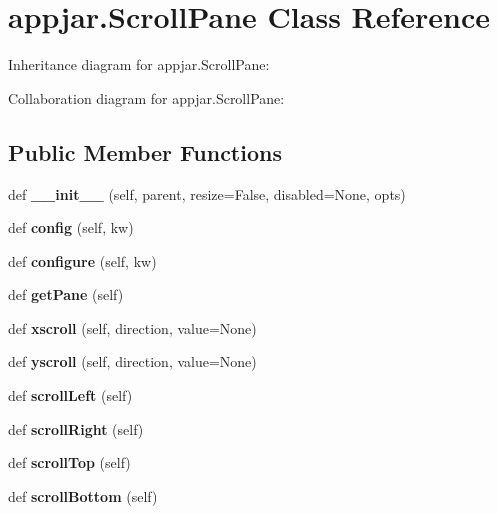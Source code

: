 \hypertarget{classappjar_1_1_scroll_pane}{}\section{appjar.\+Scroll\+Pane Class Reference}
\label{classappjar_1_1_scroll_pane}


Inheritance diagram for appjar.\+Scroll\+Pane\+:


Collaboration diagram for appjar.\+Scroll\+Pane\+:
\subsection*{Public Member Functions}
\begin{DoxyCompactItemize}
\item 
\mbox{\label{classappjar_1_1_scroll_pane_a2ba213818122fb37bff32ee236a4abc9}} 
def {\bfseries \+\_\+\+\_\+init\+\_\+\+\_\+} (self, parent, resize=False, disabled=None, opts)
\item 
\mbox{\label{classappjar_1_1_scroll_pane_ad8d4975cad232214e64f05ef09c07c0b}} 
def {\bfseries config} (self, kw)
\item 
\mbox{\label{classappjar_1_1_scroll_pane_a779e003ed78e0e6ba9e0169e16d5ee30}} 
def {\bfseries configure} (self, kw)
\item 
\mbox{\label{classappjar_1_1_scroll_pane_a1d61e55cddc464c5e5e2474b527d014b}} 
def {\bfseries get\+Pane} (self)
\item 
\mbox{\label{classappjar_1_1_scroll_pane_a0d1d7ac0fc194f2c4c2adfdd58aeec35}} 
def {\bfseries xscroll} (self, direction, value=None)
\item 
\mbox{\label{classappjar_1_1_scroll_pane_ad4ba879e469771547afe4dd0f6aea600}} 
def {\bfseries yscroll} (self, direction, value=None)
\item 
\mbox{\label{classappjar_1_1_scroll_pane_a3b900fcaf138f194244cf8fb276f509a}} 
def {\bfseries scroll\+Left} (self)
\item 
\mbox{\label{classappjar_1_1_scroll_pane_a45fabbe7ea843b742d4f27ac942e77c5}} 
def {\bfseries scroll\+Right} (self)
\item 
\mbox{\label{classappjar_1_1_scroll_pane_ad4422fb1b42d7c21891e79ed82af920b}} 
def {\bfseries scroll\+Top} (self)
\item 
\mbox{\label{classappjar_1_1_scroll_pane_abbe921b9486e552f4682e534c9ad1913}} 
def {\bfseries scroll\+Bottom} (self)
\end{DoxyCompactItemize}
